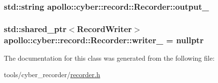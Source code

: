 \hypertarget{classapollo_1_1cyber_1_1record_1_1Recorder_a882605447aa4a2057c9b23257b73e353}{
\subsubsection[{output\-\_\-}]{\setlength{\rightskip}{0pt plus 5cm}std\-::string apollo\-::cyber\-::record\-::\-Recorder\-::output\-\_\-\hspace{0.3cm}{\ttfamily [private]}}}\label{classapollo_1_1cyber_1_1record_1_1Recorder_a882605447aa4a2057c9b23257b73e353}
\hypertarget{classapollo_1_1cyber_1_1record_1_1Recorder_a84a6307202707dd3af88342aa5b587a0}{
\subsubsection[{writer\-\_\-}]{\setlength{\rightskip}{0pt plus 5cm}std\-::shared\-\_\-ptr$<${\bf Record\-Writer}$>$ apollo\-::cyber\-::record\-::\-Recorder\-::writer\-\_\- = nullptr\hspace{0.3cm}{\ttfamily [private]}}}\label{classapollo_1_1cyber_1_1record_1_1Recorder_a84a6307202707dd3af88342aa5b587a0}


The documentation for this class was generated from the following file\-:\begin{DoxyCompactItemize}
\item 
tools/cyber\-\_\-recorder/\hyperlink{recorder_8h}{recorder.\-h}\end{DoxyCompactItemize}
